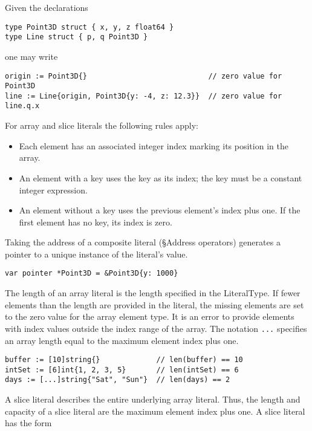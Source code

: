 {Given the declarations

\begin{Verbatim}[frame=single]
type Point3D struct { x, y, z float64 }
type Line struct { p, q Point3D }
\end{Verbatim}

one may write

\begin{Verbatim}[frame=single]
origin := Point3D{}                            // zero value for Point3D
line := Line{origin, Point3D{y: -4, z: 12.3}}  // zero value for line.q.x
\end{Verbatim}

For array and slice literals the following rules apply:

\begin{itemize}
\item
  Each element has an associated integer index marking its position in
  the array.
\item
  An element with a key uses the key as its index; the key must be a
  constant integer expression.
\item
  An element without a key uses the previous element's index plus one.
  If the first element has no key, its index is zero.
\end{itemize}

Taking the address of a composite literal
(§Address operators) generates a pointer
to a unique instance of the literal's value.

\begin{Verbatim}[frame=single]
var pointer *Point3D = &Point3D{y: 1000}
\end{Verbatim}

The length of an array literal is the length specified in the
LiteralType. If fewer elements than the length are provided in the
literal, the missing elements are set to the zero value for the array
element type. It is an error to provide elements with index values
outside the index range of the array. The notation \texttt{...}
specifies an array length equal to the maximum element index plus one.

\begin{Verbatim}[frame=single]
buffer := [10]string{}             // len(buffer) == 10
intSet := [6]int{1, 2, 3, 5}       // len(intSet) == 6
days := [...]string{"Sat", "Sun"}  // len(days) == 2
\end{Verbatim}

A slice literal describes the entire underlying array literal. Thus, the
length and capacity of a slice literal are the maximum element index
plus one. A slice literal has the form

}
